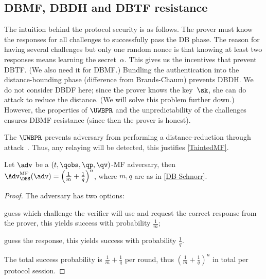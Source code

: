 \subsection{\acs*{DBMF}, \acs*{DBDH} and \acs*{DBTF} resistance}

The intuition behind the protocol security is as follows.
The prover must know the responses for all challenges to successfully pass the 
\ac{DB} phase.
The reason for having several challenges but only one random nonce is that 
knowing at least two responses means learning the secret~\(\alpha\).
This gives us the incentives that prevent \ac{DBTF}.
(We also need it for \ac{DBMF}.)
Bundling the authentication into the distance-bounding phase (difference from 
Brands-Chaum) prevents \ac{DBDH}.
We do not consider \ac{DBDF} here; since the prover knows the key~\(\sk\), she 
can do  attack to reduce the distance.
(We will solve this problem further down.)
However, the properties of \(\UWBPR\) and the unpredictability of the 
challenges ensures \ac{DBMF} resistance (since then the prover is honest).

The \(\UWBPR\) prevents  adversary from performing a 
distance-reduction through  attack~\cite{UWBPR}.
Thus, any relaying will be detected, \ie this justifies \cref{TaintedMF}.

\begin{theorem}
  Let \(\adv\) be a \((t, \qobs, \qp, \qv)\)-MF adversary, then 
  \(\Adv_{\DBS}^{\text{MF}}(\adv) = \left(\frac{1}{m}+\frac{1}{q}\right)^n\), 
  where \(m, q\) are as in \cref{DB-Schnorr}.
\end{theorem}

\begin{proof}
  The adversary has two options:
  \begin{enumerate*}
  \item guess which challenge the verifier will use and request the correct 
    response from the prover, this yields success with probability 
    \(\frac{1}{m}\);
  \item guess the response, this yields success with probability 
    \(\frac{1}{q}\).
  \end{enumerate*}
  The total success probability is \(\frac{1}{m} + \frac{1}{q}\) per round, 
  thus \(\left(\frac{1}{m}+\frac{1}{q}\right)^n\) in total per protocol 
  session.
\end{proof}

